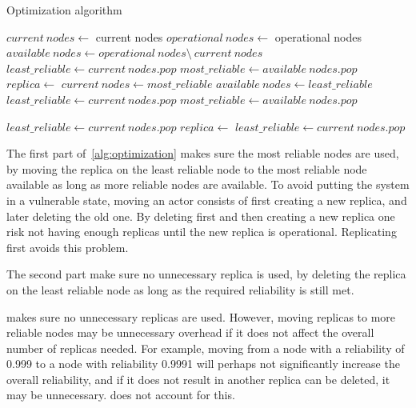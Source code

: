 \documentclass{cslthse-msc}
\begin{document}
\begin{algorithm} 
	\caption{Optimization algorithm} \label{alg:optimization}
	\begin{algorithmic}[1]
	\State $current\ nodes\gets $ current nodes
	\State $operational\ nodes\gets $ operational nodes
	\State $available\ nodes\gets operational\ nodes \setminus \ current\ nodes$
	\State
	\State
	\State $least\_reliable\gets current\ nodes.pop$
	\State $most\_reliable\gets available\ nodes.pop$
			\State $replica\gets $
			\State
			\State
			\State
			\State $current\ nodes\gets most\_reliable$
			\State $available\ nodes\gets least\_reliable$
			\State $least\_reliable\gets current\ nodes.pop$
			\State $most\_reliable\gets available\ nodes.pop$
	\EndWhile
	\EndProcedure
	\State
	
	\State $least\_reliable\gets current\ nodes.pop$
		\State $replica\gets $
		\State
		\State $least\_reliable\gets current\ nodes.pop$
	\EndWhile
	\EndProcedure
	\end{algorithmic}
\end{algorithm}

The first part of~\cref{alg:optimization} makes sure the most reliable nodes are used, by moving the replica on the least reliable node to the most reliable node available as long as more reliable nodes are available. To avoid putting the system in a vulnerable state, moving an actor consists of first creating a new replica, and later deleting the old one. By deleting first and then creating a new replica one risk not having enough replicas until the new replica is operational. Replicating first avoids this problem.

The second part make sure no unnecessary replica is used, by deleting the replica on the least reliable node as long as the required reliability is still met.

 makes sure no unnecessary replicas are used. However, moving replicas to more reliable nodes may be unnecessary overhead if it does not affect the overall number of replicas needed. For example, moving from a node with a reliability of 0.999 to a node with reliability 0.9991 will perhaps not significantly increase the overall reliability, and if it does not result in another replica can be deleted, it may be unnecessary.  does not account for this.
\end{document}
